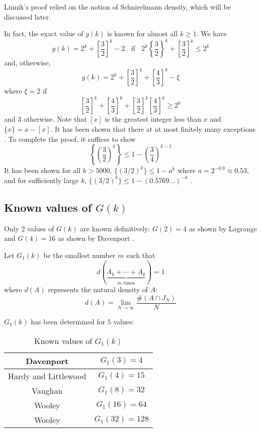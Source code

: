 Linnik's proof relied on the notion of Schnirelmann density, which will be discussed later.

In fact, the exact value of $g(k)$ is known for almost all $k\ge1$. We have
$$g(k)=2^k+\left[\frac32\right]^k-2\;\;\text{ if }\;\; 2^k\left\{\frac32\right\}^k+\left[\frac32\right]^k\le2^k$$
and, otherwise,
$$g(k)=2^k+\left[\frac32\right]^k+\left[\frac43\right]^k-\xi$$
where $\xi=2$ if $$\left[\frac32\right]^k+\left[\frac43\right]^k+\left[\frac32\right]^k\left[\frac43\right]^k\ge2^k$$
and $3$ otherwise. Note that $[x]$ is the greatest integer less than $x$ and $\{x\}=x-[x]$. It has been shown that there at at most finitely many exceptions \cite{Mahler_1957}. To complete the proof, it suffices to show
$$\left\{\left(\frac32\right)^k\right\}\le1-\left(\frac34\right)^{k-1}$$
It has been shown for all $k > 5000$, $\{(3/2)^k\}\le1-a^{k}$ where $a=2^{-0.9}\approx0.53$, and for sufficiently large $k$, $\{(3/2)^k\}\le1-(0.5769\dots)^{-k}$ \cite{Dubitskas1990ALB} \cite{Bennett_1993}.

\subsection{Known values of $G(k)$}

Only 2 values of $G(k)$ are known definitively: $G(2)=4$ as shown by Lagrange and $G(4)=16$ as shown by Davenport \cite{7dbd7a34-182d-3a8c-ac41-9dfc57f8937a}.

\begin{definition}
    Let $G_1(k)$ be the smallest number $m$ such that
    $$d(\underbrace{A_k+\cdots+A_k}_{m\text{ times}})=1$$
    where $d(A)$ represents the natural density of $A$:
    $$d(A)=\lim_{N\to\infty}\frac{\#(A\cap J_N)}{N}$$
\end{definition}

$G_1(k)$ has been determined for $5$ values:

\begin{table}[ht]
    \def\arraystretch{1.2}
    \centering
    \begin{tabular}{|c|c|}
        \hline
        Davenport \cite{Davenport1939} & $G_1(3)=4$\\
        \hline
        Hardy and Littlewood \cite{Hardy1925} & $G_1(4)=15$\\
        \hline
        Vaughan \cite{Vaughan1986} & $G_1(8)=32$\\
        \hline
        Wooley \cite{wooley_1992} & $G_1(16)=64$\\
        \hline
        Wooley \cite{wooley_1992} & $G_1(32)=128$\\
        \hline
    \end{tabular}
    \caption{Known values of $G_1(k)$}
    \label{tab:G1values}
\end{table}

